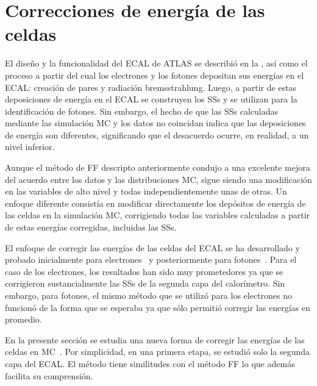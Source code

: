 \section{Correcciones de energía de las celdas}
\label{sec:ss_corrections:cell_rw}

El diseño y la funcionalidad del \ac{ECAL} de \ac{ATLAS} se describió en la \Sect{\ref{subsubsec:atlas:atlas:cals:ecal}}, así como el proceso a partir del cual los electrones y los fotones depositan sus energías en el \ac{ECAL}: creación de pares y radiación bremsstrahlung. Luego, a partir de estas deposiciones de energía en el \ac{ECAL} se construyen los \acp{SS} y se utilizan para la identificación de fotones. Sin embargo, el hecho de que las \acp{SS} calculadas mediante las simulación \ac{MC} y los datos no coincidan indica que las deposiciones de energía son diferentes, significando que el desacuerdo ocurre, en realidad, a un nivel inferior.

Aunque el método de \ac{FF} descripto anteriormente condujo a una excelente mejora del acuerdo entre los datos y las distribuciones \ac{MC}, sigue siendo una modificación en las variables de alto nivel y todas independientemente unas de otras. Un enfoque diferente consistía en modificar directamente los depósitos de energía de las celdas en la simulación \ac{MC}, corrigiendo todas las variables calculadas a partir de estas energías corregidas, incluidas las \acp{SS}.


El enfoque de corregir las energías de las celdas del \ac{ECAL} se ha desarrollado y probado inicialmente para electrones~\cite{thesis_khandoga} y posteriormente para fotones~\cite{thesis_belfkir}. Para el caso de los electrones, los resultados han sido muy prometedores ya que se corrigieron sustancialmente las \acp{SS} de la segunda capa del calorímetro. Sin embargo, para fotones, el mismo método que se utilizó para los electrones no funcionó de la forma que se esperaba ya que sólo permitió corregir las energías en promedio.

En la presente sección se estudia una nueva forma de corregir las energías de las celdas en \ac{MC}~\cite{ATLAS-QT-Sili}. Por simplicidad, en una primera etapa, se estudió solo la segunda capa del \ac{ECAL}. El método tiene similitudes con el método \ac{FF} lo que además facilita su comprensión.






